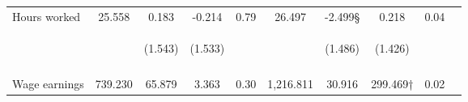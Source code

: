 \begin{tabular}{lccccccccc}
\noalign{\smallskip}Hours worked & 25.558 & 0.183 & -0.214 & 0.79 & 26.497 & -2.499§ & 0.218 & 0.04 & \\
 & \begin{footnotesize}\end{footnotesize} & \begin{footnotesize}(1.543)\end{footnotesize} & \begin{footnotesize}(1.533)\end{footnotesize} & \begin{footnotesize}\end{footnotesize} & \begin{footnotesize}\end{footnotesize} & \begin{footnotesize}(1.486)\end{footnotesize} & \begin{footnotesize}(1.426)\end{footnotesize} & \begin{footnotesize}\end{footnotesize} & \begin{footnotesize}\end{footnotesize}\\
 & \begin{footnotesize}\end{footnotesize} & \begin{footnotesize}[0.837]\end{footnotesize} & \begin{footnotesize}[1.000]\end{footnotesize} & \begin{footnotesize}\end{footnotesize} & \begin{footnotesize}\end{footnotesize} & \begin{footnotesize}[0.411]\end{footnotesize} & \begin{footnotesize}[1.000]\end{footnotesize} & \begin{footnotesize}\end{footnotesize} & \begin{footnotesize}\end{footnotesize}\\
\noalign{\smallskip}Wage earnings & 739.230 & 65.879 & 3.363 & 0.30 & 1,216.811 & 30.916 & 299.469† & 0.02 & \\

\end{tabular}
